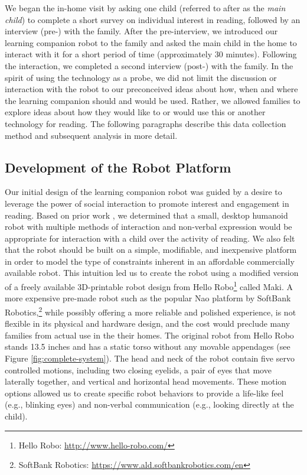 \documentclass{sigchi}
\begin{document}
 
We began the in-home visit by asking one child (referred to after as the \textit{main child}) to complete a short survey on individual interest in reading, followed by an interview (pre-) with the family. After the pre-interview, we introduced our learning companion robot to the family and asked the main child in the home to interact with it for a short period of time (approximately 30 minutes). Following the interaction, we completed a second interview (post-) with the family. In the spirit of using the technology as a probe, we did not limit the discussion or interaction with the robot to our preconceived ideas about how, when and where the learning companion should and would be used. Rather, we allowed families to explore ideas about how they would like to or would use this or another technology for reading. The following paragraphs describe this data collection method and subsequent analysis in more detail.
 
\subsection{Development of the Robot Platform}
Our initial design of the learning companion robot was guided by a desire to leverage the power of social interaction to promote interest and engagement in reading. Based on prior work \cite{Duffy:2003}, we determined that a small, desktop humanoid robot with multiple methods of interaction and non-verbal expression would be appropriate for interaction with a child over the activity of reading. We also felt that the robot should be built on a simple, modifiable, and inexpensive platform in order to model the type of constraints inherent in an affordable commercially available robot. This intuition led us to create the robot using a modified version of a freely available 3D-printable robot design from Hello Robo\footnote{Hello Robo: \href{http://www.hello-robo.com/}{http://www.hello-robo.com/}} called Maki. A more expensive pre-made robot such as the popular Nao platform by SoftBank Robotics,\footnote{SoftBank Robotics: \href{https://www.ald.softbankrobotics.com/en}{https://www.ald.softbankrobotics.com/en}} while possibly offering a more reliable and polished experience, is not flexible in its physical and hardware design, and the cost would preclude many families from actual use in the their homes. The original robot from Hello Robo stands 13.5 inches and has a static torso without any movable appendages (see Figure \ref{fig:complete-system}). The head and neck of the robot contain five servo controlled motions, including two closing eyelids, a pair of eyes that move laterally together, and vertical and horizontal head movements. These motion options allowed us to create specific robot behaviors to provide a life-like feel (e.g., blinking eyes) and non-verbal communication (e.g., looking directly at the child). 
\end{document}

